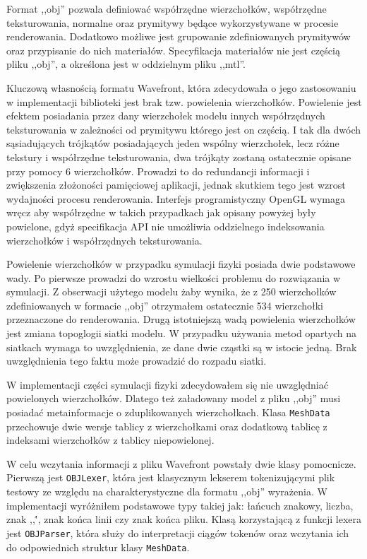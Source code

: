 {Format ,,obj'' pozwala definiować współrzędne wierzchołków,
współrzędne teksturowania, normalne oraz prymitywy będące wykorzystywane w
procesie renderowania. Dodatkowo możliwe jest grupowanie zdefiniowanych
prymitywów oraz przypisanie do nich materiałów. Specyfikacja materiałów nie
jest częścią pliku ,,obj'', a określona jest w oddzielnym pliku ,,mtl''.

Kluczową własnością formatu Wavefront, która zdecydowała o jego zastosowaniu w
implementacji biblioteki jest brak tzw. powielenia wierzchołków.
Powielenie jest efektem posiadania przez dany wierzchołek modelu
innych współrzędnych teksturowania w zależności od prymitywu którego jest on
częścią. I tak dla dwóch sąsiadujących trójkątów posiadających jeden wspólny
wierzchołek, lecz różne tekstury i
współrzędne teksturowania, dwa trójkąty zostaną ostatecznie opisane przy pomocy 6
wierzchołków. Prowadzi to do redundancji informacji i zwiększenia złożoności
pamięciowej aplikacji, jednak skutkiem tego jest wzrost wydajności procesu
renderowania. Interfejs programistyczny OpenGL wymaga wręcz aby współrzędne w
takich przypadkach jak opisany powyżej były powielone, gdyż specifikacja API nie umożliwia
oddzielnego indeksowania wierzchołków i współrzędnych teksturowania.

Powielenie wierzchołków w przypadku symulacji fizyki posiada dwie podstawowe wady. Po
pierwsze prowadzi do wzrostu wielkości problemu do rozwiązania w symulacji. Z
obserwacji użytego modelu żaby wynika, że z 250 wierzchołków zdefiniowanych w
formacie ,,obj'' otrzymałem ostatecznie 534 wierzchołki przeznaczone do
renderowania. Drugą istotniejszą wadą powielenia wierzchołków jest zmiana
topoglogii siatki modelu. W przypadku używania metod opartych na siatkach wymaga
to uwzględnienia, ze dane dwie cząstki są w istocie jedną. Brak uwzględnienia
tego faktu może prowadzić do rozpadu siatki.

W implementacji części symulacji fizyki zdecydowałem się nie uwzględniać
powielonych wierzchołków. Dlatego też załadowany model z pliku ,,obj'' musi
posiadać metainformacje o zduplikowanych wierzchołkach. Klasa \texttt{MeshData}
przechowuje dwie wersje tablicy z wierzchołkami oraz dodatkową tablicę
z indeksami wierzchołków z tablicy niepowielonej.

W celu wczytania informacji z pliku Wavefront powstały dwie klasy pomocnicze.
Pierwszą jest \texttt{OBJLexer}, która jest klasycznym lekserem tokenizującymi
plik testowy ze względu na charakterystyczne dla formatu ,,obj'' wyrażenia. W
implementacji wyróżniłem podstawowe typy takiej jak: łańcuch znakowy, liczba,
znak ,,\'', znak końca linii czy znak końca pliku. Klasą korzystającą z funkcji
	lexera jest \texttt{OBJParser}, która służy do interpretacji ciągów tokenów
	oraz wczytania ich do odpowiednich struktur klasy \texttt{MeshData}.

}

